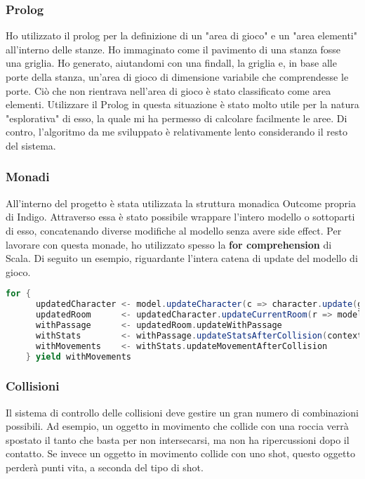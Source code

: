 \subsubsection{Prolog}
Ho utilizzato il prolog per la definizione di un "area di gioco" e un "area elementi" all'interno delle stanze. Ho immaginato come il pavimento di una stanza fosse una griglia. 
Ho generato, aiutandomi con una findall, la griglia e, in base alle porte della stanza, un'area di gioco di dimensione variabile che comprendesse le porte. 
Ciò che non rientrava nell'area di gioco è stato classificato come area elementi.
Utilizzare il Prolog in questa situazione è stato molto utile per la natura "esplorativa" di esso, la quale mi ha permesso di calcolare facilmente le aree. Di contro, l'algoritmo da me sviluppato è relativamente lento considerando il resto del sistema. 

\subsubsection{Monadi}
All'interno del progetto è stata utilizzata la struttura monadica Outcome propria di Indigo. 
Attraverso essa è stato possibile wrappare l'intero modello o sottoparti di esso, concatenando diverse modifiche al modello senza avere side effect. Per lavorare con questa monade, ho utilizzato spesso la \textbf{for comprehension} di Scala. 
Di seguito un esempio, riguardante l'intera catena di update del modello di gioco. 
\begin{lstlisting}[language=Scala]
for {
      updatedCharacter <- model.updateCharacter(c => character.update(gameContext))
      updatedRoom      <- updatedCharacter.updateCurrentRoom(r => model.currentRoom.update(character))
      withPassage      <- updatedRoom.updateWithPassage
      withStats        <- withPassage.updateStatsAfterCollision(context)
      withMovements    <- withStats.updateMovementAfterCollision
    } yield withMovements
\end{lstlisting} 

\subsubsection{Collisioni}
Il sistema di controllo delle collisioni deve gestire un gran numero di combinazioni possibili. 
Ad esempio, un oggetto in movimento che collide con una roccia verrà spostato il tanto che basta per non intersecarsi, ma non ha ripercussioni dopo il contatto. 
Se invece un oggetto in movimento collide con uno shot, questo oggetto perderà punti vita, a seconda del tipo di shot. 

